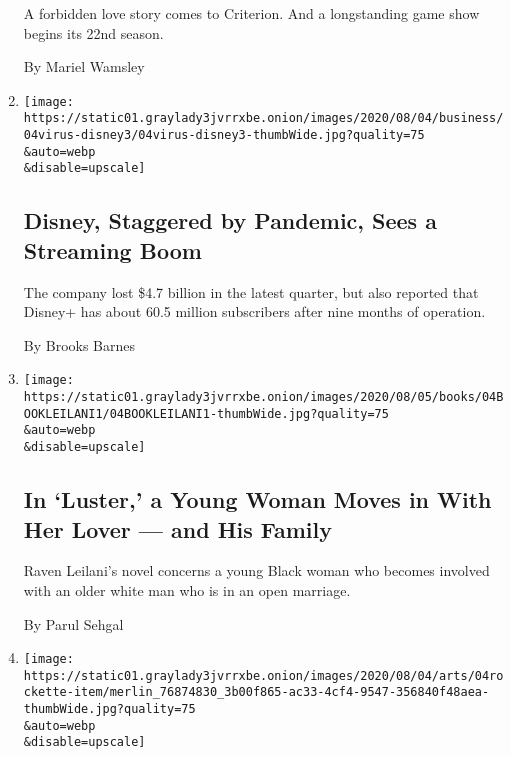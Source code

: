\begin{enumerate}
  A forbidden love story comes to Criterion. And a longstanding game
  show begins its 22nd season.

  By Mariel Wamsley
\item
  \href{/2020/08/04/business/media/disney-earnings-coronavirus.html}{}

  \texttt{[image: https://static01.graylady3jvrrxbe.onion/images/2020/08/04/business/04virus-disney3/04virus-disney3-thumbWide.jpg?quality=75\\\&auto=webp\\\&disable=upscale]}

  \hypertarget{disney-staggered-by-pandemic-sees-a-streaming-boom}{%
  \subsection{Disney, Staggered by Pandemic, Sees a Streaming
  Boom}\label{disney-staggered-by-pandemic-sees-a-streaming-boom}}

  The company lost \$4.7 billion in the latest quarter, but also
  reported that Disney+ has about 60.5 million subscribers after nine
  months of operation.

  By Brooks Barnes
\item
  \href{/2020/08/04/books/review-luster-raven-leilani.html}{}

  \texttt{[image: https://static01.graylady3jvrrxbe.onion/images/2020/08/05/books/04BOOKLEILANI1/04BOOKLEILANI1-thumbWide.jpg?quality=75\\\&auto=webp\\\&disable=upscale]}

  \hypertarget{in-luster-a-young-woman-moves-in-with-her-lover--and-his-family}{%
  \subsection{In `Luster,' a Young Woman Moves in With Her Lover --- and
  His
  Family}\label{in-luster-a-young-woman-moves-in-with-her-lover--and-his-family}}

  Raven Leilani's novel concerns a young Black woman who becomes
  involved with an older white man who is in an open marriage.

  By Parul Sehgal
\item
  \href{/2020/08/04/theater/radio-city-rockettes-christmas-canceled.html}{}

  \texttt{[image: https://static01.graylady3jvrrxbe.onion/images/2020/08/04/arts/04rockette-item/merlin\_76874830\_3b00f865-ac33-4cf4-9547-356840f48aea-thumbWide.jpg?quality=75\\\&auto=webp\\\&disable=upscale]}

  \hypertarget{the-rockettes-christmas-spectacular-is-canceled}{%
}
\end{enumerate}
